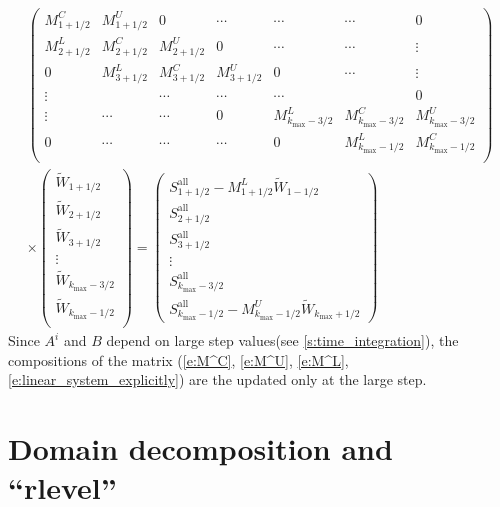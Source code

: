 \begin{equation}
\begin{gathered}
  \begin{pmatrix}
 M^C_{1+1/2} & M^U_{1+1/2} & 0 & \cdots & \cdots & \cdots & 0 \\
 M^L_{2+1/2} & M^C_{2+1/2} & M^U_{2+1/2}& 0 & \cdots& \cdots& \vdots \\
  0 & M^L_{3+1/2} & M^C_{3+1/2} & M^U_{3+1/2} & 0 & \cdots & \vdots \\
  \vdots & & \cdots & \cdots & \cdots & & 0\\
  \vdots & \cdots & \cdots & 0 & M^L_{k_\text{max}-3/2}  &M^C_{k_\text{max}-3/2} & M^U_{k_\text{max}-3/2} \\
  0 & \cdots & \cdots & \cdots & 0 & M^L_{k_\text{max}-1/2} &  M^C_{k_\text{max}-1/2} \\
  \end{pmatrix}\\
 \times
  \begin{pmatrix}
   \tilde{W}_{1+1/2}\\
   \tilde{W}_{2+1/2}\\
   \tilde{W}_{3+1/2}\\
   \vdots\\
   \tilde{W}_{k_\text{max}-3/2}\\
   \tilde{W}_{k_\text{max}-1/2}\\
  \end{pmatrix}
  =
  \begin{pmatrix}
   S^\text{all}_{1+1/2} - M^L_{1+1/2} \tilde{W}_{1-1/2}\\
   S^\text{all}_{2+1/2}\\
   S^\text{all}_{3+1/2}\\
   \vdots\\
   S^\text{all}_{k_\text{max}-3/2}\\
   S^\text{all}_{k_\text{max}-1/2} - M^U_{k_\text{max}-1/2}\tilde{W}_{k_\text{max}+1/2}
  \end{pmatrix}
\end{gathered}\label{e:linear_system_explicitly}
\end{equation}
%
Since $A^i$ and $B$ depend on large step values(see \autoref{s:time_integration}), the
compositions of the matrix (\autoref{e:M^C},
\ref{e:M^U}, \ref{e:M^L}, \ref{e:linear_system_explicitly}) are
the updated only at the large step.


\section{Domain decomposition and ``rlevel''}

